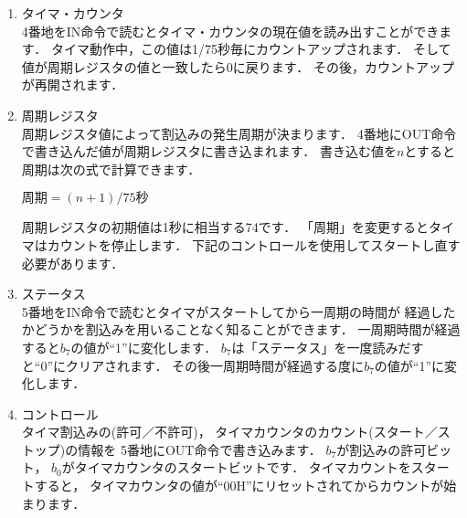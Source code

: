 \begin{enumerate}
\item タイマ・カウンタ \\
4番地をIN命令で読むとタイマ・カウンタの現在値を読み出すことができます．
タイマ動作中，この値は1/75秒毎にカウントアップされます．
そして値が周期レジスタの値と一致したら0に戻ります．
その後，カウントアップが再開されます．

\begin{center}
\epsfxsize=4.9cm
\end{center}

\item 周期レジスタ \\
周期レジスタ値によって割込みの発生周期が決まります．
4番地にOUT命令で書き込んだ値が周期レジスタに書き込まれます．
書き込む値を$n$とすると周期は次の式で計算できます．

$周期=(n+1)/75 秒$

周期レジスタの初期値は1秒に相当する74です．
「周期」を変更するとタイマはカウントを停止します．
下記のコントロールを使用してスタートし直す必要があります．

\begin{center}
\epsfxsize=4.9cm
\end{center}

\item ステータス \\
5番地をIN命令で読むとタイマがスタートしてから一周期の時間が
経過したかどうかを割込みを用いることなく知ることができます．
一周期時間が経過すると$b_7$の値が``1''に変化します．
$b_7$は「ステータス」を一度読みだすと``0''にクリアされます．
その後一周期時間が経過する度に$b_7$の値が``1''に変化します．

\begin{center}
\epsfxsize=4.9cm
\end{center}

\item コントロール \\
タイマ割込みの(許可／不許可)，
タイマカウンタのカウント(スタート／ストップ)の情報を
5番地にOUT命令で書き込みます．
$b_7$が割込みの許可ビット，
$b_0$がタイマカウンタのスタートビットです．
タイマカウントをスタートすると，
タイマカウンタの値が``00H''にリセットされてからカウントが始まります．

\begin{center}
\epsfxsize=4.9cm
\end{center}
\end{enumerate}

